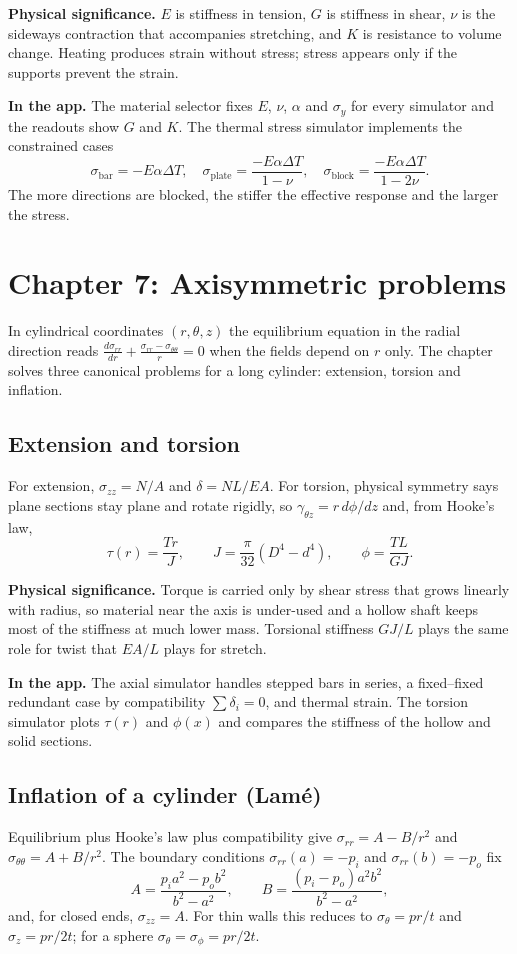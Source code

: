\documentclass[11pt,a4paper]{article}
\newcommand{\app}[1]{\par\smallskip\noindent\textbf{In the app.} #1}
\newcommand{\sig}[1]{\par\smallskip\noindent\textbf{Physical significance.} #1}
\begin{document}
\sig{$E$ is stiffness in tension, $G$ is stiffness in shear, $\nu$ is the sideways contraction that accompanies stretching, and $K$ is resistance to volume change. Heating produces strain without stress; stress appears only if the supports prevent the strain.}
\app{The material selector fixes $E$, $\nu$, $\alpha$ and $\sigma_y$ for every simulator and the readouts show $G$ and $K$. The thermal stress simulator implements the constrained cases
\begin{equation}
\sigma_{\text{bar}}=-E\alpha\Delta T,\quad
\sigma_{\text{plate}}=\frac{-E\alpha\Delta T}{1-\nu},\quad
\sigma_{\text{block}}=\frac{-E\alpha\Delta T}{1-2\nu}.
\end{equation}
The more directions are blocked, the stiffer the effective response and the larger the stress.}

\section{Chapter 7: Axisymmetric problems}
In cylindrical coordinates $(r,\theta,z)$ the equilibrium equation in the radial direction reads $\frac{d\sigma_{rr}}{dr}+\frac{\sigma_{rr}-\sigma_{\theta\theta}}{r}=0$ when the fields depend on $r$ only. The chapter solves three canonical problems for a long cylinder: extension, torsion and inflation.

\subsection{Extension and torsion}
For extension, $\sigma_{zz}=N/A$ and $\delta=NL/EA$. For torsion, physical symmetry says plane sections stay plane and rotate rigidly, so $\gamma_{\theta z}=r\,d\phi/dz$ and, from Hooke's law,
\begin{equation}
\tau(r)=\frac{T r}{J},\qquad J=\frac{\pi}{32}(D^4-d^4),\qquad \phi=\frac{TL}{GJ}.
\end{equation}
\sig{Torque is carried only by shear stress that grows linearly with radius, so material near the axis is under-used and a hollow shaft keeps most of the stiffness at much lower mass. Torsional stiffness $GJ/L$ plays the same role for twist that $EA/L$ plays for stretch.}
\app{The axial simulator handles stepped bars in series, a fixed--fixed redundant case by compatibility $\sum\delta_i=0$, and thermal strain. The torsion simulator plots $\tau(r)$ and $\phi(x)$ and compares the stiffness of the hollow and solid sections.}

\subsection{Inflation of a cylinder (Lam\'e)}
Equilibrium plus Hooke's law plus compatibility give $\sigma_{rr}=A-B/r^2$ and $\sigma_{\theta\theta}=A+B/r^2$. The boundary conditions $\sigma_{rr}(a)=-p_i$ and $\sigma_{rr}(b)=-p_o$ fix
\begin{equation}
A=\frac{p_ia^2-p_ob^2}{b^2-a^2},\qquad
B=\frac{(p_i-p_o)a^2b^2}{b^2-a^2},
\end{equation}
and, for closed ends, $\sigma_{zz}=A$. For thin walls this reduces to $\sigma_\theta=pr/t$ and $\sigma_z=pr/2t$; for a sphere $\sigma_\theta=\sigma_\phi=pr/2t$.
\end{document}
